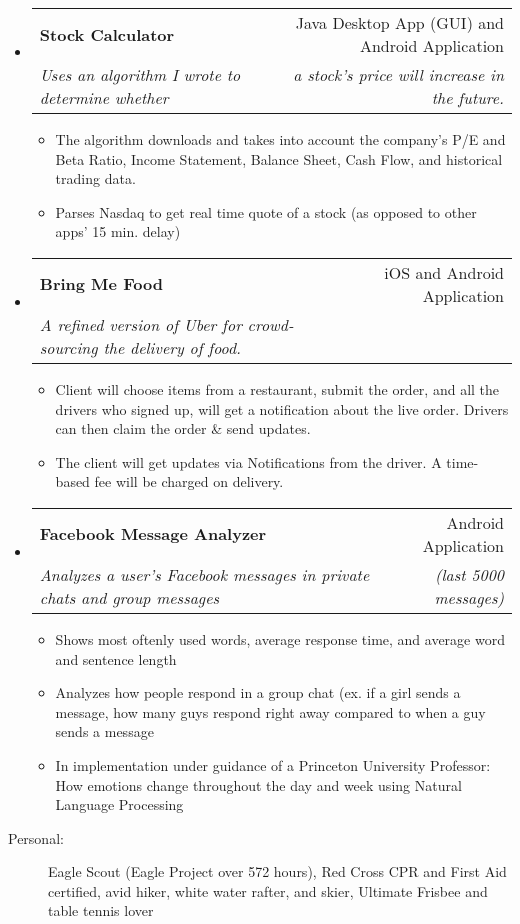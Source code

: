 \documentclass[letterpaper,11pt]{article}
\makeatletter
\newcommand{\resitem}[1]{\item #1 \vspace{-2pt}}
\newcommand{\ressubheading}[4]{
\begin{tabular*}{6.5in}{l@{\extracolsep{\fill}}r}
		\textbf{#1} & #2 \\
		\textit{#3} & \textit{#4} \\
\end{tabular*}\vspace{-6pt}}
\makeatother
\begin{document}
\begin{itemize}

\item
	\ressubheading{Stock Calculator}{Java Desktop App (GUI) and 		Android Application}{Uses an algorithm I wrote to 				determine whether}{a stock's price will increase in the 		future.\space\space\space\space\space\space\space\space			\space}
	\begin{itemize}
		\resitem{The algorithm downloads and takes into account 			the company's P/E and Beta Ratio, Income Statement, 			Balance Sheet, Cash Flow, and historical trading 					data.}
		\resitem{Parses Nasdaq to get real time quote of a 					stock (as opposed to other apps' 15 min. delay)}
	\end{itemize}

\item
	\ressubheading{Bring Me Food}{iOS and Android Application}
		{A refined version of Uber for crowd-sourcing the 				delivery of food.}{}
	\begin{itemize}
		\resitem{Client will choose items from a restaurant, submit the order, and all the drivers who signed up, will get a notification about the live order. Drivers can then claim the order \& send updates.}
		\resitem{The client will get updates via Notifications from the driver. A time-based fee will be charged on delivery.}
	\end{itemize}
	
\item
	\ressubheading{Facebook Message Analyzer}
		{Android Application}{Analyzes a user's Facebook 					messages in private chats and group messages}{(last 				5000 messages)\space\space\space\space\space\space}
	\begin{itemize}
		\resitem{Shows most oftenly used words, average 						response time, and average word and sentence 					length}
		\resitem{Analyzes how people respond in a group chat 					(ex. if a girl sends a message, how many guys 					respond right away compared to when a guy sends a 				message}
		\resitem{In implementation under guidance of a 						Princeton University Professor: How emotions change
			throughout the day and week using Natural Language 				Processing}
	\end{itemize}
\end{itemize}

\begin{description}
	\item[Personal:]Eagle Scout (Eagle Project over 572 hours), 		Red Cross CPR and First Aid certified, avid hiker, 				white water rafter, and skier, Ultimate Frisbee and 				table tennis lover
\end{description}
\end{document}
